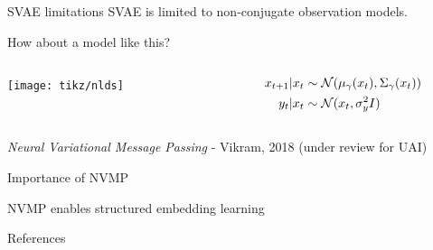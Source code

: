 \documentclass[10pt, compress]{beamer}
\begin{document}
\begin{frame}{SVAE limitations}
  \centering
  SVAE is limited to non-conjugate observation models. 
  
  \pause
  How about a model like this?
  \pause
  \vspace{40pt}

  \begin{columns}
    \begin{column}{0.3\textwidth}
      \texttt{[image: tikz/nlds]}
    \end{column}
    \begin{column}{0.3\textwidth}
      \begin{align*}
          x_{t + 1} | x_t &\sim \mathcal{N}(\mu_\gamma(x_t), \Sigma_\gamma(x_t)) \\
          y_t | x_t &\sim \mathcal{N}(x_t, \sigma^2_yI)
      \end{align*}
    \end{column}
  \end{columns}
  \pause
  \vspace{20pt}
  \emph{Neural Variational Message Passing} - Vikram, 2018 (under review for UAI)
\end{frame}


\begin{frame}{Importance of NVMP}
  \begin{center}
    NVMP enables structured embedding learning
  \end{center}
\end{frame}

\begin{frame}[allowframebreaks]{References}
    
     
\end{frame}

\end{document}
